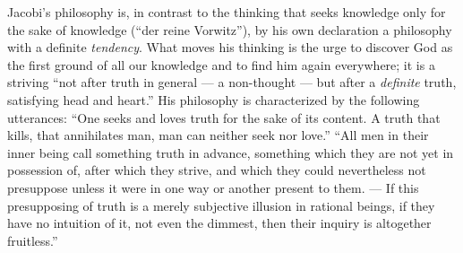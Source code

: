Jacobi's philosophy is, in contrast to the thinking that seeks
knowledge only for the sake of knowledge (``der reine Vorwitz''), by
his own declaration a philosophy with a definite \emph{tendency}. What
moves his thinking is the urge to discover God as the first ground of
all our knowledge and to find him again everywhere; it is a striving
``not after truth in general --- a non-thought --- but after a
\emph{definite} truth, satisfying head and heart.'' His philosophy is
characterized by the following utterances: ``One seeks and loves truth
for the sake of its content. A truth that kills, that annihilates man,
man can neither seek nor love.'' ``All men in their inner
being call something truth in advance, something which they are not
yet in possession of, after which they strive, and which they could
nevertheless not presuppose unless it were in one way or another
present to them. --- If this presupposing of truth is a merely
subjective illusion in rational beings, if they have no intuition of
it, not even the dimmest, then their inquiry is altogether
fruitless.''

